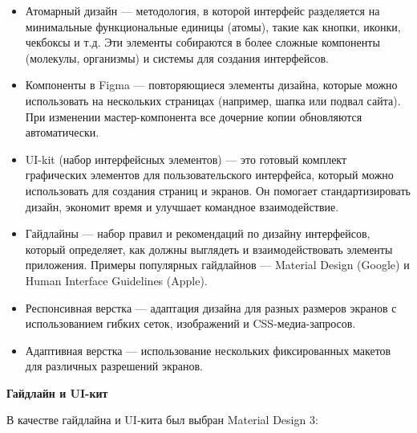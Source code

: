 \begin{itemize}
    \item Атомарный дизайн — методология, в которой интерфейс разделяется на минимальные функциональные единицы (атомы), такие как кнопки, иконки, чекбоксы и т.д. Эти элементы собираются в более сложные компоненты (молекулы, организмы) и системы для создания интерфейсов.
    \item Компоненты в Figma — повторяющиеся элементы дизайна, которые можно использовать на нескольких страницах (например, шапка или подвал сайта). При изменении мастер-компонента все дочерние копии обновляются автоматически.
    \item UI-kit (набор интерфейсных элементов) — это готовый комплект графических элементов для пользовательского интерфейса, который можно использовать для создания страниц и экранов. Он помогает стандартизировать дизайн, экономит время и улучшает командное взаимодействие.
    \item Гайдлайны — набор правил и рекомендаций по дизайну интерфейсов, который определяет, как должны выглядеть и взаимодействовать элементы приложения. Примеры популярных гайдлайнов — Material Design (Google) и Human Interface Guidelines (Apple).
    \item Респонсивная верстка — адаптация дизайна для разных размеров экранов с использованием гибких сеток, изображений и CSS-медиа-запросов.
    \item Адаптивная верстка — использование нескольких фиксированных макетов для различных разрешений экранов.
\end{itemize}
\bigskip

\textbf{Гайдлайн и UI-кит}
\bigskip

В качестве гайдлайна и UI-кита был выбран Material Design 3:

